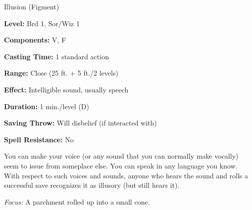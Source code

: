 
Illusion (Figment)

\textbf{Level:} Brd 1, Sor/Wiz 1

\textbf{Components:} V, F

\textbf{Casting Time:} 1 standard action

\textbf{Range:} Close (25 ft. + 5 ft./2 levels)

\textbf{Effect:} Intelligible sound, usually speech

\textbf{Duration:} 1 min./level (D)

\textbf{Saving Throw:} Will disbelief (if interacted with)

\textbf{Spell Resistance:} No

You can make your voice (or any sound that you can normally make vocally) seem 
to issue from someplace else. You can speak in any language you know. With respect 
to such voices and sounds, anyone who hears the sound and rolls a successful save 
recognizes it as illusory (but still hears it).

\textit{Focus:} A parchment rolled up into a small cone.

